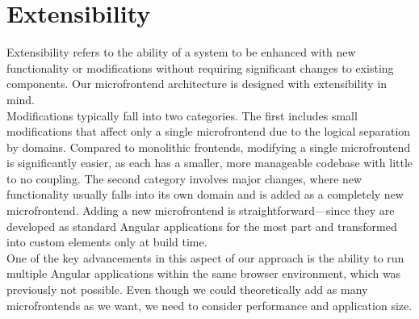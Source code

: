 \section{Extensibility}
Extensibility refers to the ability of a system to be enhanced with new functionality or modifications without requiring significant changes to existing components. Our microfrontend architecture is designed with extensibility in mind. \\

\noindent
Modifications typically fall into two categories. The first includes small modifications that affect only a single microfrontend due to the logical separation by domains. Compared to monolithic frontends, modifying a single microfrontend is significantly easier, as each has a smaller, more manageable codebase with little to no coupling. The second category involves major changes, where new functionality usually falls into its own domain and is added as a completely new microfrontend. Adding a new microfrontend is straightforward—since they are developed as standard Angular applications for the most part and transformed into custom elements only at build time. \\

\noindent
One of the key advancements in this aspect of our approach is the ability to run multiple Angular applications within the same browser environment, which was previously not possible. Even though we could theoretically add as many microfrontends as we want, we need to consider performance and application size.\\

